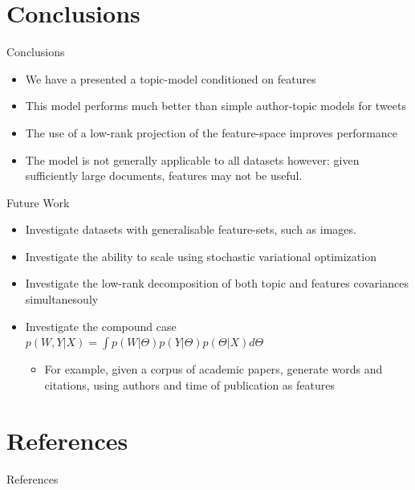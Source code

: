 \documentclass[xcolor=dvipsnames]{beamer}
\begin{document}
\section{Conclusions}
\begin{frame}{Conclusions}
\begin{itemize}
    \item We have a presented a topic-model conditioned on features
    \item This model performs much better than simple author-topic models for tweets
    \item The use of a low-rank projection of the feature-space improves performance
    \item The model is not generally applicable to all datasets however: given sufficiently large documents, features may not be useful.
\end{itemize}
\end{frame}

\begin{frame}{Future Work}
    \begin{itemize}
    \item Investigate datasets with generalisable feature-sets, such as images.
    \item Investigate the ability to scale using stochastic variational optimization \cite{Hoffman2012}
    \item Investigate the low-rank decomposition of both topic and features covariances simultanesouly
    \item Investigate the compound case $p(W,Y|X) = \int p(W|\Theta) p(Y|\Theta) p(\Theta|X) d\Theta$
        \begin{itemize}
            \item For example, given a corpus of academic papers, generate words and citations, using authors and time of publication as features
        \end{itemize}
     \end{itemize}
\end{frame}


\begin{frame}

\end{frame}






\section{References}
\begin{frame}[allowframebreaks]{References}

{\tiny 
    
    
}

\end{frame}
\end{document}
